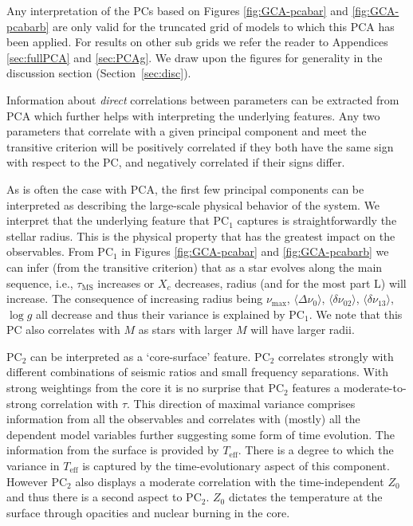 Any interpretation of the PCs based on Figures \ref{fig:GCA-pcabar} and \ref{fig:GCA-pcabarb} are only valid for the truncated grid of models to which this PCA has been applied. For results on other sub grids we refer the reader to Appendices \ref{sec:fullPCA} and \ref{sec:PCAg}. 
We draw upon the figures for generality in the discussion section (Section~\ref{sec:disc}).


Information about \emph{direct} correlations between parameters can be extracted from PCA which further helps with interpreting the underlying features.
Any two parameters that correlate with a given principal component and meet the transitive criterion will be positively correlated if they both have the same sign with respect to the PC, and negatively correlated if their signs differ. 

As is often the case with PCA, the first few principal components can be interpreted as describing the large-scale physical behavior of the system.
We interpret that the underlying feature that PC$_1$ captures is straightforwardly the stellar radius.  
This is the physical property that has the greatest impact on the observables.
From PC$_1$ in Figures \ref{fig:GCA-pcabar} and \ref{fig:GCA-pcabarb} we can infer (from the transitive criterion) that as a star evolves along the main sequence, i.e., $\tau_{\text{MS}}$ increases or $X_c$ decreases, radius (and for the most part L) will increase.  
The consequence of increasing radius being $\nu_{\max}$, 
${\langle\Delta\nu_0\rangle}$,
${\langle\delta\nu_{02}\rangle}$, 
${\langle\delta\nu_{13}\rangle}$,
 ${\log{} g}$ all decrease and thus their variance is explained by PC$_1$. 
We note that this PC also correlates with $M$ as stars with larger $M$ will have larger radii.  


PC$_2$ can be interpreted as a `core-surface' feature.
PC$_2$ correlates strongly with different combinations of seismic ratios and small frequency separations. %
With strong weightings from the core it is no surprise that PC$_2$ features a moderate-to-strong correlation with $\tau$.  
This direction of maximal variance comprises information from all the observables and correlates with (mostly) all the dependent model variables further suggesting some form of time evolution. 
The information from the surface is provided by $T_{\text{eff}}$.  
There is a degree to which the variance in $T_{\text{eff}}$ is captured by the time-evolutionary aspect of this component. 
However PC$_2$ also displays a moderate correlation with the time-independent $Z_0$ and thus there is a second aspect to  PC$_2$.
$Z_0$ dictates the temperature at the surface through opacities and nuclear burning in the core.

